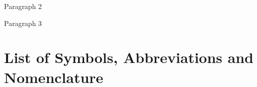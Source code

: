 \documentclass[12pt]{ucalgthes1}
\begin{document}
Paragraph 2

Paragraph 3

\begin{singlespace}
\newpage
{}
\tableofcontents
\pagestyle{plain}
\newpage
{}
\listoftables
\pagestyle{plain}
\newpage
{}
\listoffigures
\pagestyle{plain}
\clearpage
\clearpage          
\end{singlespace}
\newpage
{}
\chapter*{\bf{List of Symbols, Abbreviations and Nomenclature}\hfill} 
\listofsymbols
\pagestyle{plain}
\clearpage







\appendix

\end{document}

